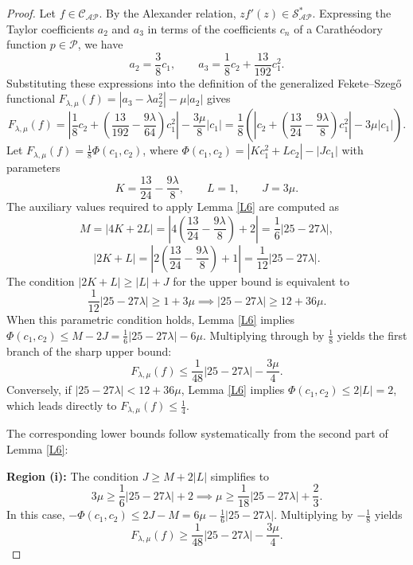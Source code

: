 \documentclass[11pt]{article}
\numberwithin{equation}{section}
\begin{document}
\begin{proof}
Let $f \in \mathcal{C}_{\mathcal{AP}}$. By the Alexander relation, $zf'(z) \in \mathcal{S}_{\mathcal{AP}}^{*}$. Expressing the Taylor coefficients $a_2$ and $a_3$ in terms of the coefficients $c_n$ of a Carath\'{e}odory function $p \in \mathcal{P}$, we have
\begin{equation}\label{po16}
a_2 = \frac{3}{8} c_1, \qquad a_3 = \frac{1}{8} c_2 + \frac{13}{192}c_1^2.
\end{equation}
Substituting these expressions into the definition of the generalized Fekete--Szeg\H{o} functional $F_{\lambda,\mu}(f) = |a_3 - \lambda a_2^2| - \mu |a_2|$ gives
\begin{equation}\label{eq:FeketeSzegoExpanded}
F_{\lambda,\mu}(f) = \left| \frac{1}{8} c_2 + \left( \frac{13}{192} - \frac{9\lambda}{64} \right)c_1^2 \right| - \frac{3\mu}{8}|c_1| = \frac{1}{8} \left( \left| c_2 + \left( \frac{13}{24} - \frac{9\lambda}{8} \right)c_1^2 \right| - 3\mu |c_1| \right).
\end{equation}
Let $F_{\lambda,\mu}(f) = \frac{1}{8} \Phi(c_1,c_2)$, where $\Phi(c_1,c_2) = |Kc_1^2 + Lc_2| - |Jc_1|$ with parameters
\[
K = \frac{13}{24} - \frac{9\lambda}{8}, \qquad L = 1, \qquad J = 3\mu.
\]
The auxiliary values required to apply Lemma \ref{L6} are computed as
\[
M = |4K+2L| = \left| 4\left(\frac{13}{24} - \frac{9\lambda}{8}\right) + 2 \right| = \frac{1}{6} |25-27\lambda|,
\]
\[
|2K+L| = \left| 2\left(\frac{13}{24} - \frac{9\lambda}{8}\right) + 1 \right| = \frac{1}{12} |25-27\lambda|.
\]
The condition $|2K+L| \ge |L|+J$ for the upper bound is equivalent to
\[
\frac{1}{12}|25-27\lambda| \ge 1 + 3\mu \implies |25-27\lambda| \ge 12 + 36\mu.
\]
When this parametric condition holds, Lemma \ref{L6} implies $\Phi(c_1,c_2) \le M-2J = \frac{1}{6}|25-27\lambda|-6\mu$. Multiplying through by $\frac{1}{8}$ yields the first branch of the sharp upper bound:
\[
F_{\lambda,\mu}(f) \le \frac{1}{48} |25 - 27\lambda| - \frac{3\mu}{4}.
\]
Conversely, if $|25-27\lambda| < 12 + 36\mu$, Lemma \ref{L6} implies $\Phi(c_1,c_2) \le 2|L| = 2$, which leads directly to $F_{\lambda,\mu}(f) \le \frac{1}{4}$.

The corresponding lower bounds follow systematically from the second part of Lemma \ref{L6}:

\medskip
\noindent\textbf{Region (i):} The condition $J \ge M+2|L|$ simplifies to
\[
3\mu \ge \frac{1}{6}|25-27\lambda| + 2 \implies \mu \ge \frac{1}{18} |25 - 27\lambda| + \frac{2}{3}.
\]
In this case, $-\Phi(c_1,c_2) \le 2J-M = 6\mu - \frac{1}{6}|25-27\lambda|$. Multiplying by $-\frac{1}{8}$ yields
\[
F_{\lambda,\mu}(f) \ge \frac{1}{48} |25 - 27\lambda| - \frac{3\mu}{4}.
\]


\end{proof}
\end{document}
